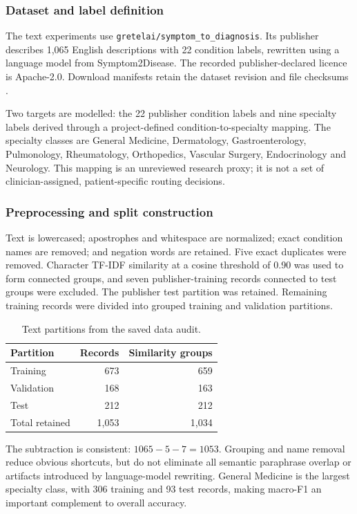 \documentclass{tietreport}
\begin{document}
\subsubsection{Dataset and label definition}
The text experiments use \texttt{gretelai/symptom\_to\_diagnosis}. Its publisher describes 1,065 English descriptions with 22 condition labels, rewritten using a language model from Symptom2Disease. The recorded publisher-declared licence is Apache-2.0. Download manifests retain the dataset revision and file checksums \cite{gretel}.

Two targets are modelled: the 22 publisher condition labels and nine specialty labels derived through a project-defined condition-to-specialty mapping. The specialty classes are General Medicine, Dermatology, Gastroenterology, Pulmonology, Rheumatology, Orthopedics, Vascular Surgery, Endocrinology and Neurology. This mapping is an unreviewed research proxy; it is not a set of clinician-assigned, patient-specific routing decisions.

\subsubsection{Preprocessing and split construction}
Text is lowercased; apostrophes and whitespace are normalized; exact condition names are removed; and negation words are retained. Five exact duplicates were removed. Character TF-IDF similarity at a cosine threshold of 0.90 was used to form connected groups, and seven publisher-training records connected to test groups were excluded. The publisher test partition was retained. Remaining training records were divided into grouped training and validation partitions.

\begin{table}[H]\centering
\begin{tabular}{lrr}\toprule Partition & Records & Similarity groups \\ \midrule
Training & 673 & 659 \\
Validation & 168 & 163 \\
Test & 212 & 212 \\
\midrule Total retained & 1,053 & 1,034 \\ \bottomrule
\end{tabular}
\caption{Text partitions from the saved data audit.}
\end{table}

The subtraction is consistent: $1065-5-7=1053$. Grouping and name removal reduce obvious shortcuts, but do not eliminate all semantic paraphrase overlap or artifacts introduced by language-model rewriting. General Medicine is the largest specialty class, with 306 training and 93 test records, making macro-F1 an important complement to overall accuracy.
\end{document}

